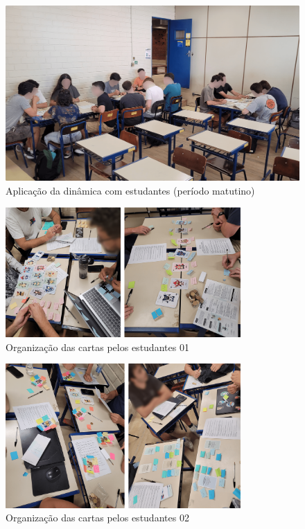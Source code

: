 \documentclass[
	12pt,
	openright,
	twoside,
	a4paper,
	english,
	brazil
	]{abntex2}
\begin{document}
\begin{figure}[H]
	\caption{\label{aplicacao-aula-alunos} Aplicação da dinâmica com estudantes (período matutino)}
  \includegraphics[width=\textwidth]{aplicacao-aula-alunos}
\end{figure}

\begin{figure}[H]
  \centering
	\caption{\label{aplicacao-aula-mesa-1} Organização das cartas pelos estudantes 01}
  \includegraphics[width=0.8\textwidth]{aplicacao-aula-mesa-1}
\end{figure}

\begin{figure}[H]
  \centering
	\caption{\label{aplicacao-aula-mesa-2} Organização das cartas pelos estudantes 02 }
  \includegraphics[width=0.8\textwidth]{aplicacao-aula-mesa-2}
\end{figure}
\end{document}
